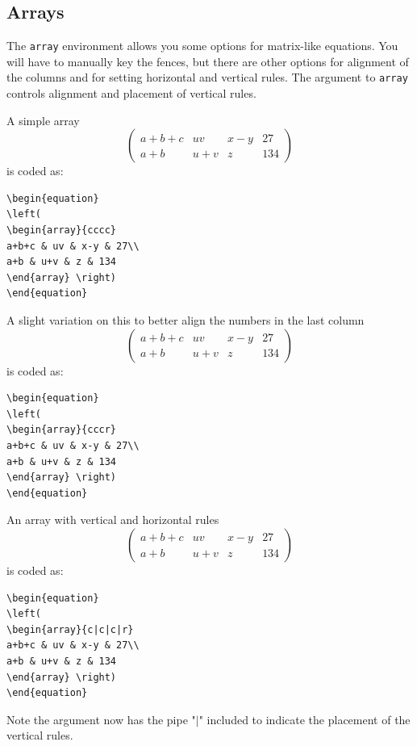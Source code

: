 \documentclass[lettersize,journal]{IEEEtran}
\begin{document}
\subsection{Arrays}
The {\tt{array}} environment allows you some options for matrix-like equations. You will have to manually key the fences, but there are other options for alignment of the columns and for setting horizontal and vertical rules. The argument to {\tt{array}} controls alignment and placement of vertical rules.

A simple array
\begin{equation}
\left(
\begin{array}{cccc}
a+b+c & uv & x-y & 27\\
a+b & u+v & z & 134
\end{array}\right)
\end{equation}
is coded as:
\begin{verbatim}
\begin{equation}
\left(
\begin{array}{cccc}
a+b+c & uv & x-y & 27\\
a+b & u+v & z & 134
\end{array} \right)
\end{equation}
\end{verbatim}

A slight variation on this to better align the numbers in the last column
\begin{equation}
\left(
\begin{array}{cccr}
a+b+c & uv & x-y & 27\\
a+b & u+v & z & 134
\end{array}\right)
\end{equation}
is coded as:
\begin{verbatim}
\begin{equation}
\left(
\begin{array}{cccr}
a+b+c & uv & x-y & 27\\
a+b & u+v & z & 134
\end{array} \right)
\end{equation}
\end{verbatim}

An array with vertical and horizontal rules
\begin{equation}
\left( \begin{array}{c|c|c|r}
a+b+c & uv & x-y & 27\\ \hline
a+b & u+v & z & 134
\end{array}\right)
\end{equation}
is coded as:
\begin{verbatim}
\begin{equation}
\left(
\begin{array}{c|c|c|r}
a+b+c & uv & x-y & 27\\
a+b & u+v & z & 134
\end{array} \right)
\end{equation}
\end{verbatim}
Note the argument now has the pipe "$\vert$" included to indicate the placement of the vertical rules.
\end{document}
